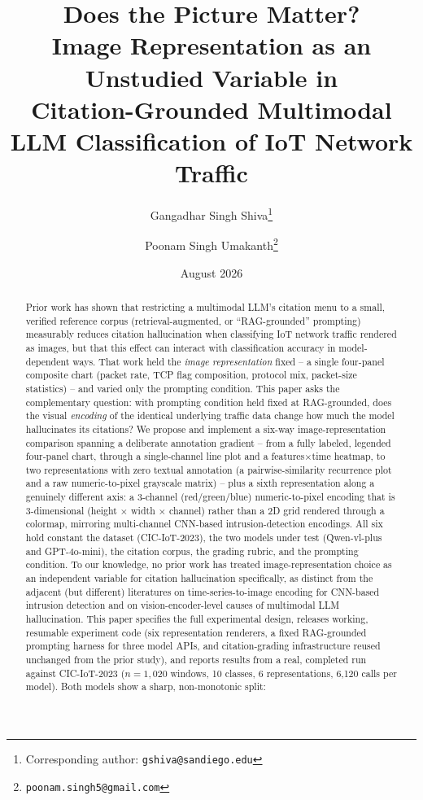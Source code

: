 \documentclass[11pt]{article}
\title{Does the Picture Matter?\\
Image Representation as an Unstudied Variable in\\
Citation-Grounded Multimodal LLM Classification of IoT Network Traffic}
\author[1]{Gangadhar Singh Shiva\thanks{Corresponding author: \texttt{gshiva@sandiego.edu}}}
\author[2]{Poonam Singh Umakanth\thanks{\texttt{poonam.singh5@gmail.com}}}
\affil[1]{University of San Diego}
\affil[2]{HPE Juniper Networking, Hewlett Packard Enterprise}
\date{August 2026}
\begin{document}
\maketitle
\sloppy

\begin{abstract}
Prior work has shown that restricting a multimodal LLM's citation menu to a small, verified
reference corpus (retrieval-augmented, or ``RAG-grounded'' prompting) measurably reduces citation
hallucination when classifying IoT network traffic rendered as images, but that this effect can
interact with classification accuracy in model-dependent ways. That work held the \emph{image
representation} fixed -- a single four-panel composite chart (packet rate, TCP flag composition,
protocol mix, packet-size statistics) -- and varied only the prompting condition. This paper asks
the complementary question: with prompting condition held fixed at RAG-grounded, does the visual
\emph{encoding} of the identical underlying traffic data change how much the model hallucinates its
citations? We propose and implement a six-way image-representation comparison spanning a
deliberate annotation gradient -- from a fully labeled, legended four-panel chart, through a
single-channel line plot and a features$\times$time heatmap, to two representations with zero
textual annotation (a pairwise-similarity recurrence plot and a raw numeric-to-pixel grayscale
matrix) -- plus a sixth representation along a genuinely different axis: a 3-channel (red/green/blue)
numeric-to-pixel encoding that is 3-dimensional (height $\times$ width $\times$ channel) rather than
a 2D grid rendered through a colormap, mirroring multi-channel CNN-based intrusion-detection
encodings. All six hold constant the dataset (CIC-IoT-2023), the two models under test (Qwen-vl-plus
and GPT-4o-mini), the citation corpus, the grading rubric, and the prompting condition. To
our knowledge, no prior work has treated image-representation choice as an independent variable
for citation hallucination specifically, as distinct from the adjacent (but different) literatures
on time-series-to-image encoding for CNN-based intrusion detection and on vision-encoder-level
causes of multimodal LLM hallucination. This paper specifies the full experimental design, releases
working, resumable experiment code (six representation renderers, a fixed RAG-grounded prompting
harness for three model APIs, and citation-grading infrastructure reused unchanged from the prior
study), and reports results from a real, completed run against CIC-IoT-2023 ($n=1{,}020$ windows,
10 classes, 6 representations, 6,120 calls per model). Both models show a sharp, non-monotonic split:

\end{abstract}
\end{document}
